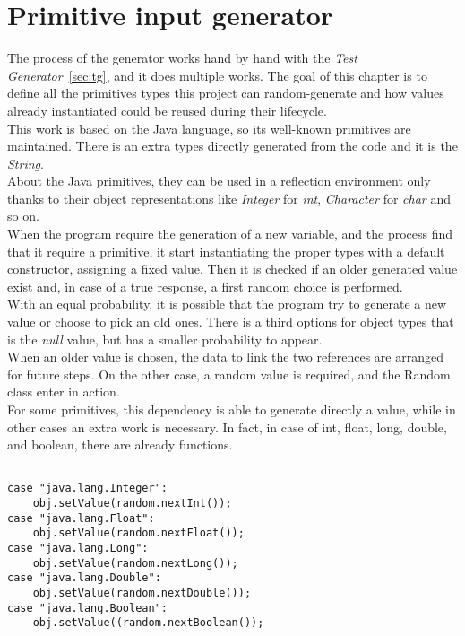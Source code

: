 \section{Primitive input generator}\label{sec:pig}
The process of the generator works hand by hand with the \emph{Test Generator}~\ref{sec:tg}, and it does multiple works.
The goal of this chapter is to define all the primitives types this project can random-generate and how values already instantiated could be reused during their lifecycle.\\
This work is based on the Java language, so its well-known primitives are maintained.
There is an extra types  directly generated from the code and it is the \emph{String}.\\
About the Java primitives, they can be used in a reflection environment only thanks to their object representations like \emph{Integer} for \emph{int}, \emph{Character} for \emph{char} and so on.\\
When the program require the generation of a new variable, and the process find that it require a primitive, it start instantiating the proper types with a default constructor, assigning a fixed value.
Then it is checked if an older generated value exist and, in case of a true response, a first random choice is performed.\\
With an equal probability, it is possible that the program try to generate a new value or choose to pick an old ones.
There is a third options for object types that is the \emph{null} value, but has a smaller probability to appear.\\
When an older value is chosen, the data to link the two references are arranged for future steps.
On the other case, a random value is required, and the Random~\cite{rand} class enter in action.\\
For some primitives, this dependency is able to generate directly a value, while in other cases an extra work is necessary.
In fact, in case of int, float, long, double, and boolean, there are already functions.
\begin{lstlisting}[caption={Random default generator},label={lst:genDef}]% Start your code-block

case "java.lang.Integer":
	obj.setValue(random.nextInt());
case "java.lang.Float":
	obj.setValue(random.nextFloat());
case "java.lang.Long":
	obj.setValue(random.nextLong());
case "java.lang.Double":
	obj.setValue(random.nextDouble());
case "java.lang.Boolean":
	obj.setValue((random.nextBoolean());
\end{lstlisting}
